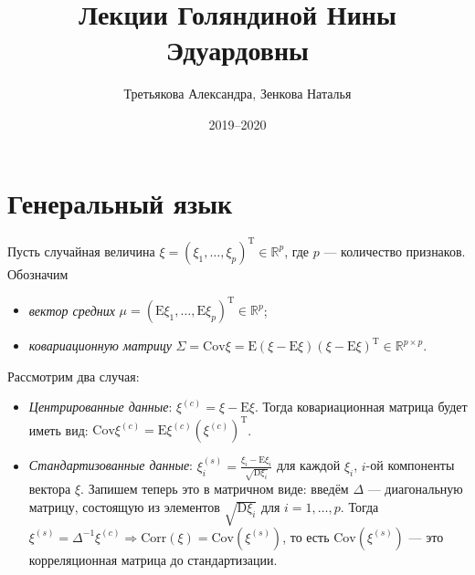 \documentclass[specialist, 12pt,
subf, %
href, colorlinks=true,
substylefile = spbu.rtx,
]{disser}
\begin{document}
	
	\lstset{
		basicstyle=\ttfamily\footnotesize, %
		numbers=left, %
		numberstyle=\footnotesize, %
		stepnumber=1, %
		numbersep=8pt, %
		language=R}
	
	
	\title{Лекции Голяндиной Нины Эдуардовны}
	
	
	\author{Третьякова Александра, Зенкова Наталья}
	

	
	\date{2019--2020}
	
	
	
	\maketitle
	\tableofcontents
	
	\intro
	\section{Генеральный язык} \label{q2}
Пусть случайная величина $\xi = (\xi_1, \ldots, \xi_p)^{\mathrm{T}} \in \mathbb{R}^p$, где $p$ --- количество признаков. Обозначим
\begin{itemize}
	\item \textit{вектор средних} $\mu = (\mathrm{E}\xi_1, \ldots, \mathrm{E}\xi_p)^{\mathrm{T}} \in \mathbb{R}^p$;
	\item \textit{ковариационную матрицу} $\Sigma = \mathrm{Cov} \xi = \mathrm{E}(\xi - \mathrm{E} \xi) (\xi - \mathrm{E} \xi)^{\mathrm{T}} \in \mathbb{R}^{p \times p}$.
\end{itemize}

Рассмотрим два случая:
\begin{itemize}
	\item \textit{Центрированные данные}: $\xi^{(c)} = \xi - \mathrm{E} \xi$. Тогда ковариационная матрица будет иметь вид: $\mathrm{Cov}\xi^{(c)} = \mathrm{E}\xi^{(c)}(\xi^{(c)})^{\mathrm{T}}$.
	\item \textit{Стандартизованные данные}: $\xi_i^{(s)} = \frac{\xi_i - \mathrm{E}\xi_i}{\sqrt{\mathrm{D}\xi_i}}$ для каждой $\xi_i$, $i$-ой компоненты вектора $\xi$. Запишем теперь это в матричном виде:
	 введём $\Delta$ --- диагональную матрицу, состоящую из элементов $\sqrt{\mathrm{D} \xi_i}$ для $i = 1, \ldots, p$. Тогда $\xi^{(s)} = \Delta^{-1} \xi^{(c)} \Rightarrow \mathrm{Corr} (\xi) = \mathrm{Cov} (\xi^{(s)})$, то есть $\mathrm{Cov}(\xi^{(s)})$ --- это корреляционная матрица до стандартизации.
\end{itemize}
\end{document}
